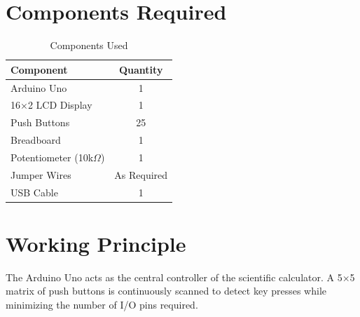 \documentclass[12pt,a4paper]{article}
\begin{document}

\section{Components Required}

\begin{table}[H]

\centering

\caption{Components Used}

\begin{tabular}{|p{8cm}|c|}

\hline

\textbf{Component} & \textbf{Quantity}\\

\hline

Arduino Uno & 1\\

\hline

16×2 LCD Display & 1\\

\hline

Push Buttons & 25\\

\hline

Breadboard & 1\\

\hline

Potentiometer (10k$\Omega$) & 1\\

\hline

Jumper Wires & As Required\\

\hline

USB Cable & 1\\

\hline

\end{tabular}

\end{table}


\section{Working Principle}

The Arduino Uno acts as the central controller of the scientific calculator. A 5×5 matrix of push buttons is continuously scanned to detect key presses while minimizing the number of I/O pins required.
\end{document}
